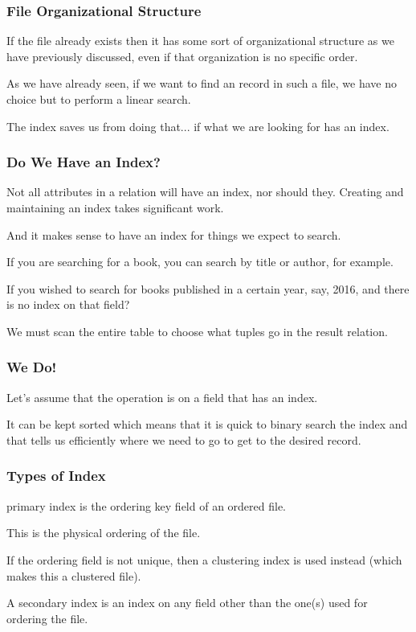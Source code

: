 \begin{frame}
\frametitle{File Organizational Structure}

If the file already exists then it has some sort of organizational structure as we have previously discussed, even if that organization is no specific order. 

As we have already seen, if we want to find an record in such a file, we have no choice but to perform a linear search. 

The index saves us from doing that... if what we are looking for has an index.


\end{frame}

\begin{frame}
\frametitle{Do We Have an Index?}

Not all attributes in a relation will have an index, nor should they. Creating and maintaining an index takes significant work. 

And it makes sense to have an index for things we expect to search. 

If you are searching for a book, you can search by title or author, for example.

If you wished to search for books published in a certain year, say, 2016, and there is no index on that field?

We must scan the entire table to choose what tuples go in the result relation.
\end{frame}


\begin{frame}
\frametitle{We Do!}

Let's assume that the operation is on a field that has an index.

It can be kept sorted which means that it is quick to binary search the index and that tells us efficiently where we need to go to get to the desired record.

\end{frame}

\begin{frame}
\frametitle{Types of Index}

\alert{primary index} is the ordering key field of an ordered file. 

This is the physical ordering of the file. 

If the ordering field is not unique, then a \alert{clustering index} is used instead (which makes this a clustered file). 

A \alert{secondary index} is an index on any field other than the one(s) used for ordering the file.

\end{frame}

